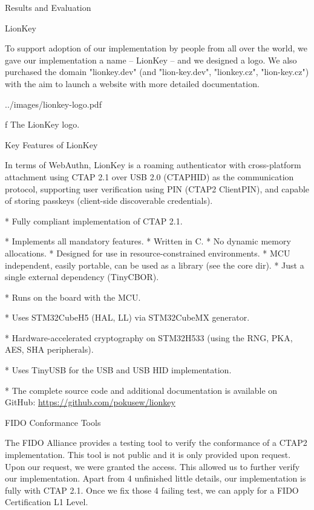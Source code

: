 \chap[evaluation] Results and Evaluation

\sec LionKey

To support adoption of our implementation by people from all over the world, we gave our implementation a name – LionKey – and we designed a logo. We also purchased the domain "lionkey.dev" (and "lion-key.dev", "lionkey.cz", "lion-key.cz") with the aim to launch a website with more detailed documentation.

\midinsert
{}
\picheight=45mm \cinspic ../images/lionkey-logo.pdf
\caption/f The LionKey logo.
\endinsert


\sec Key Features of LionKey

In terms of WebAuthn, LionKey is a roaming authenticator with cross-platform attachment using CTAP 2.1 over USB 2.0 (CTAPHID) as the communication protocol, supporting user verification using PIN (CTAP2 ClientPIN), and capable of storing passkeys (client-side discoverable credentials).

\begitems

* Fully compliant implementation of CTAP 2.1.

\begitems
* Implements all mandatory features.
* Written in {\sbf C}.
* No dynamic memory allocations.
* Designed for use in resource-constrained environments.
* MCU independent, easily portable, can be used as a library (see the core dir).
* {\sbf Just a single external dependency} (TinyCBOR).

\enditems

* Runs on the  board with the  MCU.

* Uses STM32CubeH5 (HAL, LL) via STM32CubeMX generator.

* Hardware-accelerated cryptography on STM32H533 (using the RNG, PKA, AES, SHA peripherals).

* Uses TinyUSB for the USB and USB HID implementation.

* The complete source code and additional documentation is available on GitHub:\nl
\url{https://github.com/pokusew/lionkey}

\enditems

\sec FIDO Conformance Tools

The FIDO Alliance provides a testing tool to verify the conformance of a CTAP2 implementation. This tool is not public and it is only provided upon request. Upon our request, we were granted the access. This allowed us to further verify our implementation. Apart from 4 unfinished little details, our implementation is fully with CTAP 2.1. Once we fix those 4 failing test, we can apply for a FIDO Certification L1 Level.


